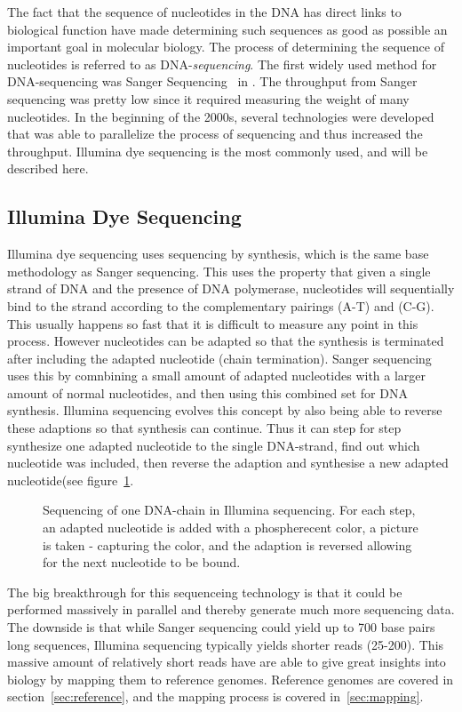 The fact that the sequence of nucleotides in the DNA has direct links to biological function have made determining such sequences as good as possible an important goal in molecular biology.
The process of determining the sequence of nucleotides is referred to as DNA-\emph{sequencing}.
The first widely used method for DNA-sequencing was Sanger Sequencing~\cite{sanger} in .
The throughput from Sanger sequencing was pretty low since it required measuring the weight of many nucleotides. 
In the beginning of the 2000s, several technologies were developed that was able to parallelize the process of sequencing and thus increased the throughput. Illumina dye sequencing is the most commonly used, and will be described here.

\subsection{Illumina Dye Sequencing}
Illumina dye sequencing uses sequencing by synthesis, which is the same base methodology as Sanger sequencing. 
This uses the property that given a single strand of DNA and the presence of DNA polymerase, nucleotides will sequentially bind to the strand according to the complementary pairings (A-T) and (C-G).
This usually happens so fast that it is difficult to measure any point in this process.
However nucleotides can be adapted so that the synthesis is terminated after including the adapted nucleotide (chain termination).
Sanger sequencing uses this by comnbining a small amount of adapted nucleotides with a larger amount of normal nucleotides, and then using this combined set for DNA synthesis.
Illumina sequencing evolves this concept by also being able to reverse these adaptions so that synthesis can continue. Thus it can step for step synthesize one adapted nucleotide to the single DNA-strand, find out which nucleotide was included, then reverse the adaption and synthesise a new adapted nucleotide(see figure~\ref{fig:illumina}.
\begin{figure}
  \tikzpicture
  
  \endtikzpicture
  \caption{Sequencing of one DNA-chain in Illumina sequencing. For each step, an adapted nucleotide is added with a phospherecent color, a picture is taken - capturing the color, and the adaption is reversed allowing for the next nucleotide to be bound.}
  \label{fig:illumina}
\end{figure}

The big breakthrough for this sequenceing technology is that it could be performed massively in parallel and thereby generate much more sequencing data.
The downside is that while Sanger sequencing could yield up to 700 base pairs long sequences, Illumina sequencing typically yields shorter reads (25-200).
This massive amount of relatively short reads have are able to give great insights into biology by mapping them to reference genomes. Reference genomes are covered in section~\ref{sec:reference}, and the mapping process is covered in~\ref{sec:mapping}.

